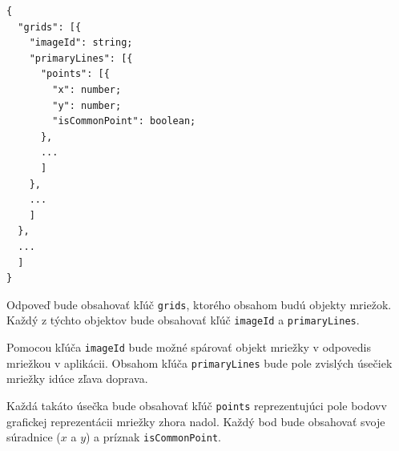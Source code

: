 \begin{minipage}[]{\linewidth}
\begin{verbatim}
{
  "grids": [{
    "imageId": string;
    "primaryLines": [{
      "points": [{
        "x": number;
        "y": number;
        "isCommonPoint": boolean;
      },
      ...
      ]
    },
    ...
    ]
  },
  ...
  ]
}
\end{verbatim}
\end{minipage}

Odpoveď bude obsahovať kľúč \texttt{grids}, ktorého obsahom budú objekty mriežok. Každý z týchto objektov bude obsahovať kľúč \texttt{imageId} a \texttt{primaryLines}.

Pomocou kľúča \texttt{imageId} bude možné spárovať objekt mriežky v odpovedi\newline s mriežkou v aplikácii. Obsahom kľúča \texttt{primaryLines} bude pole zvislých úsečiek mriežky idúce zľava doprava.

Každá takáto úsečka bude obsahovať kľúč \texttt{points} reprezentujúci pole bodov\newline v grafickej reprezentácii mriežky zhora nadol. Každý bod bude obsahovať svoje súradnice ($x$ a $y$) a príznak \texttt{isCommonPoint}.